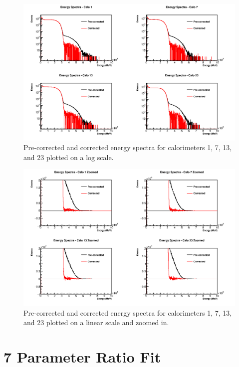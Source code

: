 	\begin{figure}[]
		\centering
		\includegraphics[width=.8\textwidth]{CaloEnergies}
	    \caption[CaloEnergies]{Pre-corrected and corrected energy spectra for calorimeters 1, 7, 13, and 23 plotted on a log scale.}    
	    \label{fig:CaloEnergies}
	\end{figure}

	\begin{figure}[]
		\centering
		\includegraphics[width=.8\textwidth]{CaloEnergiesZoomed}
	    \caption[CaloEnergiesZoomed]{Pre-corrected and corrected energy spectra for calorimeters 1, 7, 13, and 23 plotted on a linear scale and zoomed in.}    
	    \label{fig:CaloEnergiesZoomed}
	\end{figure}

\clearpage

\section{7 Parameter Ratio Fit}

